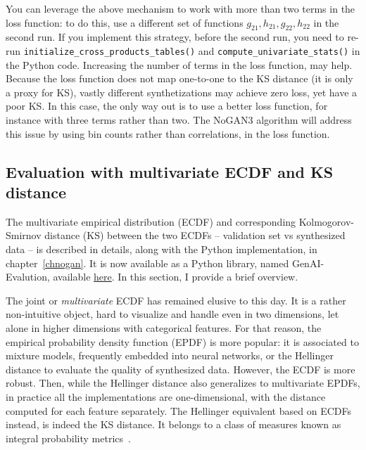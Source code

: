 \documentclass[oneside,10pt]{book}
\begin{document}
You can leverage the above mechanism to work with more than two terms in the loss function: to do this, use a different set of functions
 $g_{21}, h_{21}, g_{22}, h_{22}$ in the second run. If you implement this strategy, before the second run, you need to re-run
 \texttt{initialize\_cross\_products\_tables()}
 and \texttt{compute\_univariate\_stats()} in the Python code.
Increasing the number of terms in the loss function, may help. Because the loss function does not map one-to-one to the KS distance (it is only a proxy for KS),
 vastly different synthetizations may achieve zero loss, yet have a poor KS. In this case, the only way out is to use a better loss function, for instance with three terms rather than two. The NoGAN3 algorithm will address
 this issue by using bin counts rather than correlations, in the loss function.




\subsection{Evaluation with multivariate ECDF and KS distance}\label{bulbdres}




The \textcolor{index}{multivariate empirical distribution} (ECDF) and corresponding
 \textcolor{index}{Kolmogorov-Smirnov distance} (KS) between the two ECDFs -- validation set vs synthesized data -- is described in details, along with the Python implementation, in chapter~\ref{chnogan}. It is now available as a Python library,
 named GenAI-Evalution, available \href{https://pypi.org/project/genai-evaluation/}{here}. In this section, I provide a brief overview.

The joint or {\em multivariate} ECDF has remained elusive to this day. It is a rather non-intuitive object, hard to visualize and handle even in two dimensions, let alone in higher dimensions with categorical features. For that reason, the
 \textcolor{index}{empirical probability density function} (EPDF) is more popular: it is associated to
 \textcolor{index}{mixture models}, frequently embedded into neural networks,
  or the \textcolor{index}{Hellinger distance} to evaluate the quality of synthesized data. However, the ECDF is more robust. Then, while the Hellinger distance also generalizes to multivariate EPDFs, in practice all the implementations are one-dimensional, with the distance computed for each feature separately.  The Hellinger equivalent based on ECDFs instead, is indeed the KS distance. It belongs to a class of measures known as
 \textcolor{index}{integral probability metrics}~\cite{vcxoi54, euclidf12}.
\end{document}
